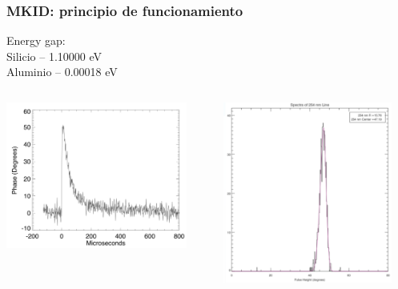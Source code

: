 \documentclass{beamer}
\begin{document}
\begin{frame}
\frametitle{MKID: principio de funcionamiento}
Energy gap:\\
Silicio --  1.10000 eV\\
Aluminio -- 0.00018 eV
								\begin{columns}
												\begin{column}{0.5\textwidth}
																\begin{center}
																				\includegraphics[height=0.54\textheight,width=0.9\textwidth]{evento_mkid1}
																\end{center}
												\end{column}
												\begin{column}{0.5\textwidth}
																\begin{center}
																				\includegraphics[height=0.54\textheight,width=0.9\textwidth]{evento_mkid2}
																\end{center}
												\end{column}
								\end{columns}


\end{frame}
\end{document}
